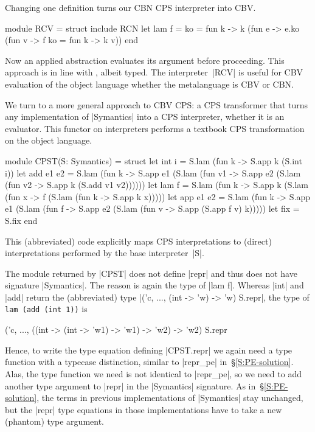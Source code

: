 Changing one definition turns our CBN CPS interpreter into CBV\@.
\begin{code}
module RCV = struct include RCN
  let lam f = {ko = fun k -> k
      (fun e -> e.ko (fun v -> f {ko = fun k -> k v}))}
end
\end{code}
Now an applied abstraction
evaluates its argument before proceeding. This approach is in
line with , albeit typed. The
interpreter~|RCV| is useful for CBV evaluation of the object language
whether the metalanguage is CBV or CBN\@.

We turn to a more general approach to CBV CPS: a CPS transformer that
turns any implementation of |Symantics| into a CPS interpreter, whether
it is an evaluator.  This functor on interpreters performs a textbook
CPS transformation on the object language.
\begin{code}
module CPST(S: Symantics) = struct
  let int i = S.lam (fun k -> S.app k (S.int i))
  let add e1 e2 = S.lam (fun k -> S.app e1 (S.lam (fun v1 ->
                                  S.app e2 (S.lam (fun v2 ->
                                  S.app k (S.add v1 v2))))))
  let lam f = S.lam (fun k -> S.app k
              (S.lam (fun x -> f (S.lam (fun k -> S.app k x)))))
  let app e1 e2 = S.lam (fun k -> S.app e1 (S.lam (fun f ->
                                  S.app e2 (S.lam (fun v ->
                                  S.app (S.app f v) k)))))
  let fix = S.fix
end
\end{code}
This (abbreviated) code explicitly maps CPS interpretations to
(direct) interpretations performed by 
the base interpreter~|S|.

The module returned by |CPST| does not define |repr|
and thus does not have signature |Symantics|.
The reason is again the type of |lam f|. Whereas
|int| and |add| return the (abbreviated) type
|('c, ..., (int -> 'w) -> 'w) S.repr|,
the type of \texttt{lam (add (int~1))} is
\begin{code}
('c, ..., ((int -> (int -> 'w1) -> 'w1) -> 'w2) -> 'w2) S.repr
\end{code}
Hence, to write the type equation defining |CPST.repr| we again need
a type function with a typecase distinction, similar to |repr_pe|
in~\S\ref{S:PE-solution}. Alas, the type function we need is not
identical to |repr_pe|, so we need to add another type argument to
|repr| in the |Symantics| signature. As in~\S\ref{S:PE-solution}, the
terms in previous implementations of |Symantics| stay unchanged, but the
|repr| type equations in those implementations have to take a new
(phantom) type argument.

